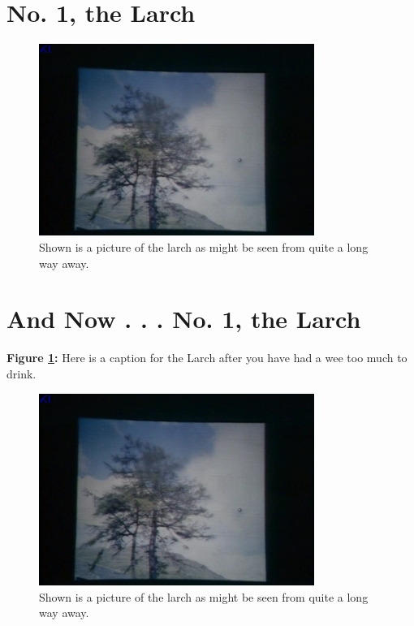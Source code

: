 \documentclass[12pt,chapterheads]{ucsd}
\begin{document}
\section{No. 1, the Larch}
\begin{figure}[ht] 
  \centering
  \includegraphics[width=0.8\textwidth]{larch}
  \caption{Shown is a picture of the larch as might be seen from quite a long way away.}
\end{figure}

\section{And Now . . . No. 1, the Larch}
\newpage
\thispagestyle{facingcaption}
\begin{center}
\vspace*{3in}
\textbf{Figure \ref{Sideways Larch}:} Here is a caption for the Larch after you have had a wee too much to drink.

\end{center}
\newpage

\begin{figure}[hb] 
  \centering
  \includegraphics[width=0.8\textwidth]{larch}
  \caption[No. 1 The Larch]{Shown is a picture of the larch as might be seen from quite a long way away.}\label{Sideways Larch}
\end{figure}
\end{document}
